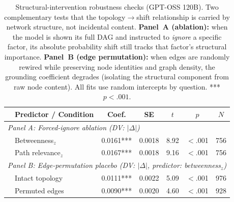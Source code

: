 \begin{table}[htbp]
\centering
\small
\caption{Structural-intervention robustness checks (GPT-OSS 120B). Two complementary tests that the topology$\rightarrow$shift relationship is carried by network structure, not incidental content. \textbf{Panel~A (ablation):} when the model is shown its full DAG and instructed to \emph{ignore} a specific factor, its absolute probability shift still tracks that factor's structural importance. \textbf{Panel~B (edge permutation):} when edges are randomly rewired while preserving node identities and graph density, the grounding coefficient degrades (isolating the structural component from raw node content). All fits use random intercepts by question. *** $p<.001$.}
\label{tab:lme_structural_robustness}
\begin{tabular}{llccccc}
\toprule
& Predictor / Condition & Coef. & SE & $t$ & $p$ & $N$ \\
\midrule
\multicolumn{7}{l}{\textit{Panel A: Forced-ignore ablation (DV: $|\Delta|$)}} \\
& Betweenness$_z$       & 0.0161*** & 0.0018 & 8.92 & $<$.001 & 756 \\
& Path relevance$_z$    & 0.0167*** & 0.0018 & 9.16 & $<$.001 & 756 \\
\midrule
\multicolumn{7}{l}{\textit{Panel B: Edge-permutation placebo (DV: $|\Delta|$, predictor: betweenness$_z$)}} \\
& Intact topology       & 0.0111*** & 0.0022 & 5.09 & $<$.001 & 976 \\
& Permuted edges        & 0.0090*** & 0.0020 & 4.60 & $<$.001 & 928 \\
\bottomrule
\end{tabular}
\end{table}
